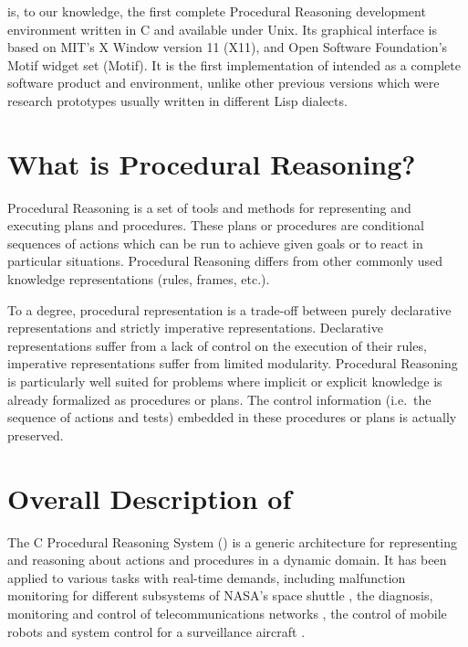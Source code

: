 \COPRSDE{} is, to our knowledge, the first complete Procedural Reasoning
development environment written in C and available under Unix. Its graphical
interface is based on MIT's X Window version 11 (X11), and
Open Software Foundation's Motif widget set (Motif).
It is the first implementation of \OPRS{} intended as a
complete software product and environment, unlike other previous versions
which were research prototypes usually written in different Lisp dialects.



\section{What is Procedural Reasoning?}

Procedural Reasoning is a set of tools and methods for representing and executing
plans and procedures. These plans or procedures are conditional sequences of
actions which can be run to achieve given goals or to react in particular
situations. Procedural Reasoning differs from other commonly used knowledge
representations (rules, frames, etc.).

To a degree, procedural representation is a trade-off between purely
declarative representations and strictly imperative representations. Declarative 
representations suffer from a lack of control on the execution of their rules,
imperative representations
suffer from limited modularity. Procedural Reasoning is particularly well suited
for problems where implicit or explicit knowledge is already formalized as
procedures or plans. The control information (i.e.\ the sequence of actions and
tests) embedded in these procedures or plans is actually preserved.

\section{Overall Description of \COPRS{}}

The C Procedural Reasoning System (\COPRS{}) is a generic architecture for
representing and reasoning about actions and procedures in a dynamic domain. It
has been applied to various tasks with real-time demands, including malfunction
monitoring for different subsystems of NASA's space shuttle
\cite{Georgeff-Ingrand90-a}, the diagnosis, monitoring and control of
telecommunications networks \cite{Wesley91}, the control of  mobile robots
\cite{Revillod92} and system control for a surveillance aircraft
\cite{Ingrand89}.

